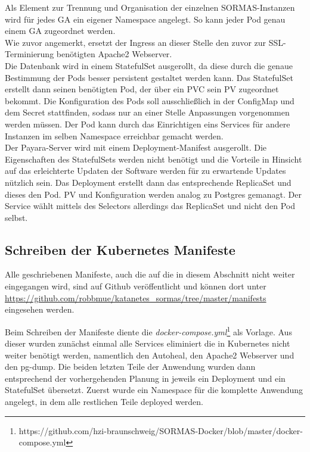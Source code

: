 Als Element zur Trennung und Organisation der einzelnen \ac{SORMAS}-Instanzen wird für jedes \ac{GA} ein eigener Namespace angelegt.
So kann jeder Pod genau einem \ac{GA} zugeordnet werden.\\
Wie zuvor angemerkt, ersetzt der Ingress an dieser Stelle den zuvor zur \ac{SSL}-Terminierung benötigten Apache2 Webserver.\\
Die Datenbank wird in einem StatefulSet ausgerollt, da diese durch die genaue Bestimmung der Pods besser persistent gestaltet werden kann.
Das StatefulSet erstellt dann seinen benötigten Pod, der über ein \ac{PVC} sein \ac{PV} zugeordnet bekommt. 
Die Konfiguration des Pods soll ausschließlich in der ConfigMap und dem Secret stattfinden, sodass nur an einer Stelle Anpassungen vorgenommen werden müssen.
Der Pod kann durch das Einrichtigen eins Services für andere Instanzen im selben Namespace erreichbar gemacht werden.\\
Der Payara-Server wird mit einem Deployment-Manifest ausgerollt. 
Die Eigenschaften des StatefulSets werden nicht benötigt und die Vorteile in Hinsicht auf das erleichterte Updaten der Software werden für zu erwartende Updates nützlich sein.
Das Deployment erstellt dann das entsprechende ReplicaSet und dieses den Pod. 
\ac{PV} und Konfiguration werden analog zu Postgres gemanagt. 
Der Service wählt mittels des Selectors allerdings das ReplicaSet und nicht den Pod selbst.


\subsection{Schreiben der Kubernetes Manifeste}

Alle geschriebenen Manifeste, auch die auf die in diesem Abschnitt nicht weiter eingegangen wird, sind auf Github veröffentlicht und können dort unter \url{https://github.com/robbmue/katanetes_sormas/tree/master/manifests} eingesehen werden. 

Beim Schreiben der Manifeste diente die \textit{docker-compose.yml}\footnote{https://github.com/hzi-braunschweig/SORMAS-Docker/blob/master/docker-compose.yml} als Vorlage.
Aus dieser wurden zunächst einmal alle Services eliminiert die in Kubernetes nicht weiter benötigt werden, namentlich den Autoheal, den Apache2 Webserver und den pg-dump.
Die beiden letzten Teile der Anwendung wurden dann entsprechend der vorhergehenden Planung in jeweils ein Deployment und ein StatefulSet übersetzt.
Zuerst wurde ein Namespace für die komplette Anwendung angelegt, in dem alle restlichen Teile deployed werden.

